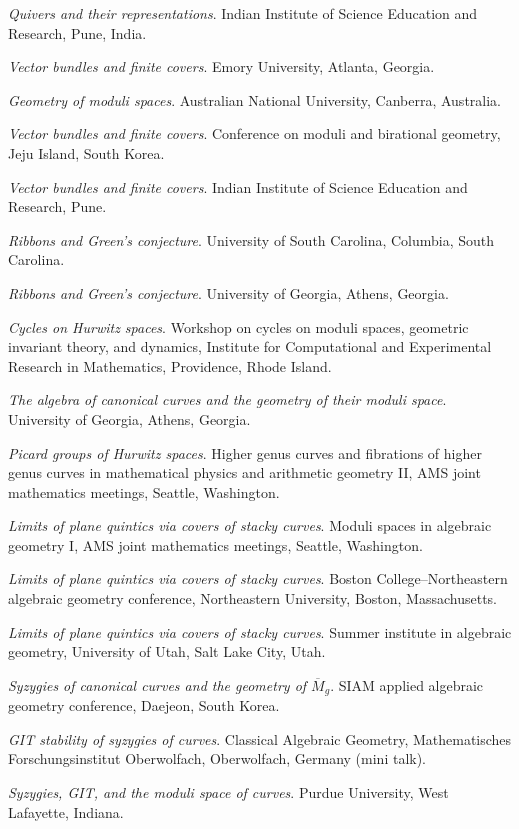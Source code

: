 \documentclass[11pt]{article}
\begin{document}
\begin{description}
\emph{Quivers and their representations}.
Indian Institute of Science Education and Research, Pune, India.

\emph{Vector bundles and finite covers}.
Emory University, Atlanta, Georgia.
\item[{2016}] \emph{Geometry of moduli spaces}.
Australian National University, Canberra, Australia.

\emph{Vector bundles and finite covers}.
Conference on moduli and birational geometry, Jeju Island, South Korea.

\emph{Vector bundles and finite covers}.
Indian Institute of Science Education and Research, Pune.

\emph{Ribbons and Green's conjecture}.
University of South Carolina, Columbia, South Carolina.

\emph{Ribbons and Green's conjecture}.
University of Georgia, Athens, Georgia.

\emph{Cycles on Hurwitz spaces}.
Workshop on cycles on moduli spaces, geometric invariant theory, and dynamics, Institute for Computational and Experimental Research in Mathematics, Providence, Rhode Island.

\emph{The algebra of canonical curves and the geometry of their moduli space}.
University of Georgia, Athens, Georgia.

\emph{Picard groups of Hurwitz spaces}.
Higher genus curves and fibrations of higher genus curves in mathematical physics and arithmetic geometry II, AMS joint mathematics meetings, Seattle, Washington.

\emph{Limits of plane quintics via covers of stacky curves}.
Moduli spaces in algebraic geometry I, AMS joint mathematics meetings, Seattle, Washington.
\item[{2015}] \emph{Limits of plane quintics via covers of stacky curves}.
Boston College--Northeastern algebraic geometry conference, Northeastern University, Boston, Massachusetts.

\emph{Limits of plane quintics via covers of stacky curves}.
Summer institute in algebraic geometry, University of Utah, Salt Lake City, Utah.

\emph{Syzygies of canonical curves and the geometry of \(\overline M_g\)}.
SIAM applied algebraic geometry conference, Daejeon, South Korea.

\emph{GIT stability of syzygies of curves}.
Classical Algebraic Geometry, Mathematisches Forschungsinstitut Oberwolfach, Oberwolfach, Germany (mini talk).

\emph{Syzygies, GIT, and the moduli space of curves}.
Purdue University, West Lafayette, Indiana.


\end{description}
\end{document}
